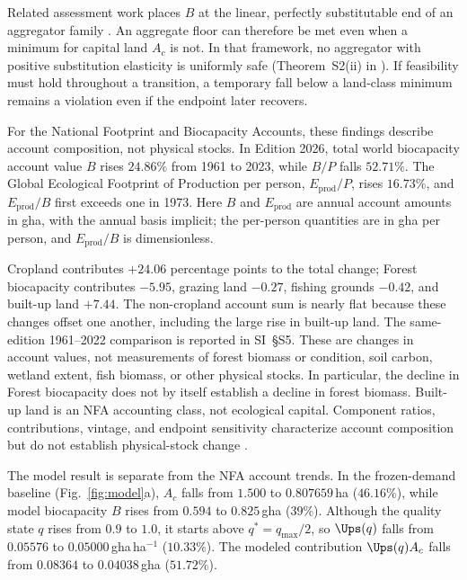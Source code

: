 Related assessment work places $B$ at the linear, perfectly substitutable end of an aggregator family \citep[Lemma~A of][]{Abaee2026b}. An aggregate floor can therefore be met even when a minimum for capital land $A_c$ is not. In that framework, no aggregator with positive substitution elasticity is uniformly safe (Theorem~S2(ii) in \citet{Abaee2026b}). If feasibility must hold throughout a transition, a temporary fall below a land-class minimum remains a violation even if the endpoint later recovers.

For the National Footprint and Biocapacity Accounts, these findings describe account composition, not physical stocks. In Edition 2026, total world biocapacity account value $B$ rises $24.86\%$ from 1961 to 2023, while $B/P$ falls $52.71\%$. The Global Ecological Footprint of Production per person, $E_{\mathrm{prod}}/P$, rises $16.73\%$, and $E_{\mathrm{prod}}/B$ first exceeds one in 1973. Here $B$ and $E_{\mathrm{prod}}$ are annual account amounts in gha, with the annual basis implicit; the per-person quantities are in gha per person, and $E_{\mathrm{prod}}/B$ is dimensionless.

Cropland contributes $+24.06$ percentage points to the total change; Forest biocapacity contributes $-5.95$, grazing land $-0.27$, fishing grounds $-0.42$, and built-up land $+7.44$. The non-cropland account sum is nearly flat because these changes offset one another, including the large rise in built-up land. The same-edition 1961--2022 comparison is reported in SI~\S S5. These are changes in account values, not measurements of forest biomass or condition, soil carbon, wetland extent, fish biomass, or other physical stocks. In particular, the decline in Forest biocapacity does not by itself establish a decline in forest biomass. Built-up land is an NFA accounting class, not ecological capital. Component ratios, contributions, vintage, and endpoint sensitivity characterize account composition but do not establish physical-stock change \citep{Lo2026NFA,Borucke2013,Blomqvist2013,GiampietroSaltelli2014,Galli2016,vdBerghGrazi2015}.

The model result is separate from the NFA account trends. In the frozen-demand baseline (Fig.~\ref{fig:model}a), $A_c$ falls from $1.500$ to $0.807659$\,ha ($46.16\%$), while model biocapacity $B$ rises from $0.594$ to $0.825$\,gha ($39\%$). Although the quality state $q$ rises from $0.9$ to $1.0$, it starts above $q^*=q_{\max}/2$, so $\Ups(q)$ falls from $0.05576$ to $0.05000$\,gha\,ha$^{-1}$ ($10.33\%$). The modeled contribution $\Ups(q)A_c$ falls from $0.08364$ to $0.04038$\,gha ($51.72\%$).

